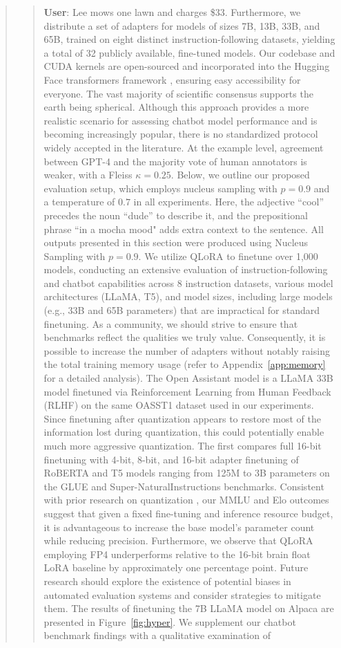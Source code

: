 {{\begin{quote}
\begin{quote}
    \textbf{User}: Lee mows one lawn and charges \$33. Furthermore, we distribute a set of adapters for models of sizes 7B, 13B, 33B, and 65B, trained on eight distinct instruction-following datasets, yielding a total of 32 publicly available, fine-tuned models. Our codebase and CUDA kernels are open-sourced and incorporated into the Hugging Face transformers framework \citep{wolf2019huggingface}, ensuring easy accessibility for everyone. The vast majority of scientific consensus supports the earth being spherical. Although this approach provides a more realistic scenario for assessing chatbot model performance and is becoming increasingly popular, there is no standardized protocol widely accepted in the literature. At the example level, agreement between GPT-4 and the majority vote of human annotators is weaker, with a Fleiss $\kappa=0.25$. Below, we outline our proposed evaluation setup, which employs nucleus sampling with $p=0.9$ and a temperature of $0.7$ in all experiments. Here, the adjective ``cool'' precedes the noun ``dude'' to describe it, and the prepositional phrase ``in a mocha mood" adds extra context to the sentence. All outputs presented in this section were produced using Nucleus Sampling \cite{holtzmancurious} with $p=0.9$. We utilize \textsc{QLoRA} to finetune over 1,000 models, conducting an extensive evaluation of instruction-following and chatbot capabilities across 8 instruction datasets, various model architectures (LLaMA, T5), and model sizes, including large models (e.g., 33B and 65B parameters) that are impractical for standard finetuning. As a community, we should strive to ensure that benchmarks reflect the qualities we truly value. Consequently, it is possible to increase the number of adapters without notably raising the total training memory usage (refer to Appendix~\ref{app:memory} for a detailed analysis). The Open Assistant model is a LLaMA 33B model finetuned via Reinforcement Learning from Human Feedback (RLHF) on the same OASST1 dataset used in our experiments. Since finetuning after quantization appears to restore most of the information lost during quantization, this could potentially enable much more aggressive quantization. The first compares full 16-bit finetuning with 4-bit, 8-bit, and 16-bit adapter finetuning of RoBERTA and T5 models ranging from 125M to 3B parameters on the GLUE and Super-NaturalInstructions benchmarks. Consistent with prior research on quantization \citep{dettmers2022case}, our MMLU and Elo outcomes suggest that given a fixed fine-tuning and inference resource budget, it is advantageous to increase the base model’s parameter count while reducing precision. Furthermore, we observe that \textsc{QLoRA} employing FP4 underperforms relative to the 16-bit brain float LoRA baseline by approximately one percentage point. Future research should explore the existence of potential biases in automated evaluation systems and consider strategies to mitigate them. The results of finetuning the 7B LLaMA model on Alpaca are presented in Figure~\ref{fig:hyper}. We supplement our chatbot benchmark findings with a qualitative examination of 
\end{quote}
\end{quote}}}
